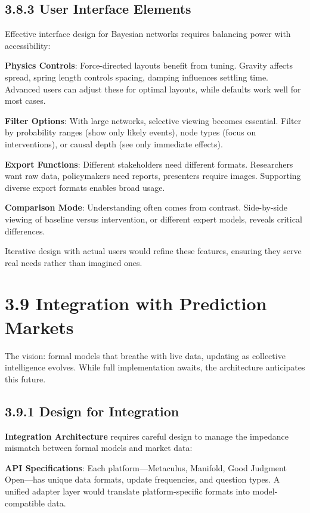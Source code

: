 \documentclass[
  11pt,
  letterpaper,
]{book}
\begin{document}
\subsection{3.8.3 User Interface Elements}\label{sec-ui-elements}

Effective interface design for Bayesian networks requires balancing
power with accessibility:

\textbf{Physics Controls}: Force-directed layouts benefit from tuning.
Gravity affects spread, spring length controls spacing, damping
influences settling time. Advanced users can adjust these for optimal
layouts, while defaults work well for most cases.

\textbf{Filter Options}: With large networks, selective viewing becomes
essential. Filter by probability ranges (show only likely events), node
types (focus on interventions), or causal depth (see only immediate
effects).

\textbf{Export Functions}: Different stakeholders need different
formats. Researchers want raw data, policymakers need reports,
presenters require images. Supporting diverse export formats enables
broad usage.

\textbf{Comparison Mode}: Understanding often comes from contrast.
Side-by-side viewing of baseline versus intervention, or different
expert models, reveals critical differences.

Iterative design with actual users would refine these features, ensuring
they serve real needs rather than imagined ones.

\section{3.9 Integration with Prediction
Markets}\label{sec-market-integration}

The vision: formal models that breathe with live data, updating as
collective intelligence evolves. While full implementation awaits, the
architecture anticipates this future.

\subsection{3.9.1 Design for Integration}\label{sec-integration-design}

\textbf{Integration Architecture} requires careful design to manage the
impedance mismatch between formal models and market data:

\textbf{API Specifications}: Each platform---Metaculus, Manifold, Good
Judgment Open---has unique data formats, update frequencies, and
question types. A unified adapter layer would translate
platform-specific formats into model-compatible data.
\end{document}
